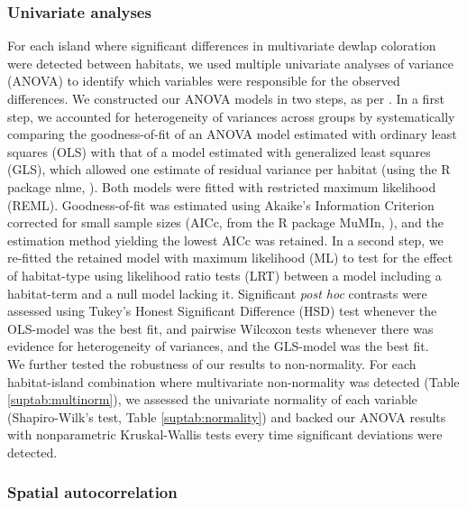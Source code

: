 \subsubsection*{Univariate analyses}

For each island where significant differences in multivariate dewlap coloration were detected between habitats, we used multiple univariate analyses of variance (ANOVA) to identify which variables were responsible for the observed differences. We constructed our ANOVA models in two steps, as per \citet{Zuur2009}. In a first step, we accounted for heterogeneity of variances across groups by systematically comparing the goodness-of-fit of an ANOVA model estimated with ordinary least squares (OLS) with that of a model estimated with generalized least squares (GLS), which allowed one estimate of residual variance per habitat (using the R package nlme, \citealt{Pinheiro2000, Pinheiro2020}). Both models were fitted with restricted maximum likelihood (REML). Goodness-of-fit was estimated using Akaike's Information Criterion corrected for small sample sizes (AICc, from the R package MuMIn, \citealt{Barton2019}), and the estimation method yielding the lowest AICc was retained. In a second step, we re-fitted the retained model with maximum likelihood (ML) to test for the effect of habitat-type using likelihood ratio tests (LRT) between a model including a habitat-term and a null model lacking it. Significant \textit{post hoc} contrasts were assessed using Tukey's Honest Significant Difference (HSD) test whenever the OLS-model was the best fit, and pairwise Wilcoxon tests whenever there was evidence for heterogeneity of variances, and the GLS-model was the best fit.\\

We further tested the robustness of our results to non-normality. For each habitat-island combination where multivariate non-normality was detected (Table \ref{suptab:multinorm}), we assessed the univariate normality of each variable (Shapiro-Wilk's test, Table \ref{suptab:normality}) and backed our ANOVA results with nonparametric Kruskal-Wallis tests every time significant deviations were detected.\\

\subsubsection*{Spatial autocorrelation}

